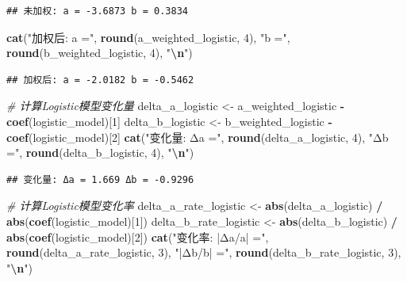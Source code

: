 \documentclass[
]{article}
\newenvironment{Shaded}{\begin{snugshade}}{\end{snugshade}}
\newcommand{\CommentTok}[1]{\textcolor[rgb]{0.56,0.35,0.01}{\textit{#1}}}
\newcommand{\DecValTok}[1]{\textcolor[rgb]{0.00,0.00,0.81}{#1}}
\newcommand{\FunctionTok}[1]{\textcolor[rgb]{0.13,0.29,0.53}{\textbf{#1}}}
\newcommand{\NormalTok}[1]{#1}
\newcommand{\OtherTok}[1]{\textcolor[rgb]{0.56,0.35,0.01}{#1}}
\newcommand{\SpecialCharTok}[1]{\textcolor[rgb]{0.81,0.36,0.00}{\textbf{#1}}}
\newcommand{\StringTok}[1]{\textcolor[rgb]{0.31,0.60,0.02}{#1}}
\begin{document}
\begin{verbatim}
## 未加权: a = -3.6873 b = 0.3834
\end{verbatim}

\begin{Shaded}
\begin{Highlighting}[]
\FunctionTok{cat}\NormalTok{(}\StringTok{"加权后: a ="}\NormalTok{, }\FunctionTok{round}\NormalTok{(a\_weighted\_logistic, }\DecValTok{4}\NormalTok{), }\StringTok{"b ="}\NormalTok{, }\FunctionTok{round}\NormalTok{(b\_weighted\_logistic, }\DecValTok{4}\NormalTok{), }\StringTok{"}\SpecialCharTok{\textbackslash{}n}\StringTok{"}\NormalTok{)}
\end{Highlighting}
\end{Shaded}

\begin{verbatim}
## 加权后: a = -2.0182 b = -0.5462
\end{verbatim}

\begin{Shaded}
\begin{Highlighting}[]
\CommentTok{\# 计算Logistic模型变化量}
\NormalTok{delta\_a\_logistic }\OtherTok{\textless{}{-}}\NormalTok{ a\_weighted\_logistic }\SpecialCharTok{{-}} \FunctionTok{coef}\NormalTok{(logistic\_model)[}\DecValTok{1}\NormalTok{]}
\NormalTok{delta\_b\_logistic }\OtherTok{\textless{}{-}}\NormalTok{ b\_weighted\_logistic }\SpecialCharTok{{-}} \FunctionTok{coef}\NormalTok{(logistic\_model)[}\DecValTok{2}\NormalTok{]}
\FunctionTok{cat}\NormalTok{(}\StringTok{"变化量: Δa ="}\NormalTok{, }\FunctionTok{round}\NormalTok{(delta\_a\_logistic, }\DecValTok{4}\NormalTok{), }\StringTok{"Δb ="}\NormalTok{, }\FunctionTok{round}\NormalTok{(delta\_b\_logistic, }\DecValTok{4}\NormalTok{), }\StringTok{"}\SpecialCharTok{\textbackslash{}n}\StringTok{"}\NormalTok{)}
\end{Highlighting}
\end{Shaded}

\begin{verbatim}
## 变化量: Δa = 1.669 Δb = -0.9296
\end{verbatim}

\begin{Shaded}
\begin{Highlighting}[]
\CommentTok{\# 计算Logistic模型变化率}
\NormalTok{delta\_a\_rate\_logistic }\OtherTok{\textless{}{-}} \FunctionTok{abs}\NormalTok{(delta\_a\_logistic) }\SpecialCharTok{/} \FunctionTok{abs}\NormalTok{(}\FunctionTok{coef}\NormalTok{(logistic\_model)[}\DecValTok{1}\NormalTok{])}
\NormalTok{delta\_b\_rate\_logistic }\OtherTok{\textless{}{-}} \FunctionTok{abs}\NormalTok{(delta\_b\_logistic) }\SpecialCharTok{/} \FunctionTok{abs}\NormalTok{(}\FunctionTok{coef}\NormalTok{(logistic\_model)[}\DecValTok{2}\NormalTok{])}
\FunctionTok{cat}\NormalTok{(}\StringTok{"变化率: |Δa/a| ="}\NormalTok{, }\FunctionTok{round}\NormalTok{(delta\_a\_rate\_logistic, }\DecValTok{3}\NormalTok{), }\StringTok{"|Δb/b| ="}\NormalTok{, }\FunctionTok{round}\NormalTok{(delta\_b\_rate\_logistic, }\DecValTok{3}\NormalTok{), }\StringTok{"}\SpecialCharTok{\textbackslash{}n}\StringTok{"}\NormalTok{)}
\end{Highlighting}
\end{Shaded}
\end{document}
